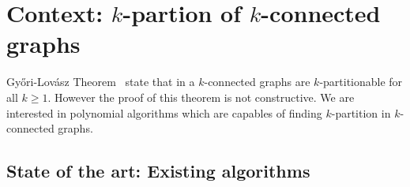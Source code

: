 \section{Context: $k$-partion of $k$-connected graphs}
Gy{\H o}ri-Lovász Theorem~\cite{GE78,LL77} state that in a $k$-connected graphs are 
$k$-partitionable for all $k \geq 1$. However the proof of this theorem
is not constructive. We are interested in polynomial algorithms which
are capables of finding $k$-partition in $k$-connected graphs.



\subsection{State of the art: Existing algorithms}

